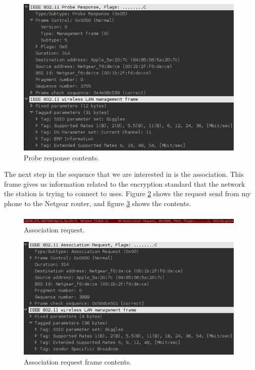 \begin{figure}[h!]
\includegraphics[width=\linewidth]{research/80211/figures/bt65.png}
\caption{Probe response contents.}
\label{research:80211:bt65}
\end{figure}

The next step in the sequence that we are interested in is the association. This frame gives us information related to the encryption standard that the network the station is trying to connect to uses. Figure \ref{research:80211:bt7} shows the request send from my phone to the Netgear router, and figure \ref{research:80211:bt8} shows the contents.

\begin{figure}[h!]
\includegraphics[width=\linewidth]{research/80211/figures/bt7.png}
\caption{Association request.}
\label{research:80211:bt7}
\end{figure}

\begin{figure}[h!]
\includegraphics[width=\linewidth]{research/80211/figures/bt8.png}
\caption{Association request frame contents.}
\label{research:80211:bt8}
\end{figure}
